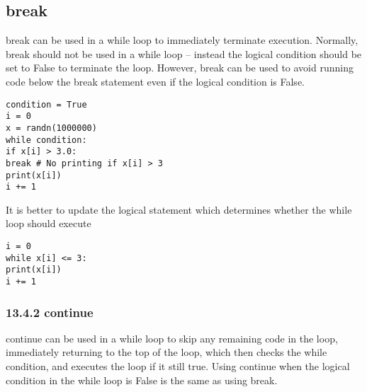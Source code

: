 \subsection{break}
break can be used in a while loop to immediately terminate execution. Normally, break should not be
used in a while loop – instead the logical condition should be set to False to terminate the loop. However,
break can be used to avoid running code below the break statement even if the logical condition is False.

\begin{framed}
\begin{verbatim}
condition = True
i = 0
x = randn(1000000)
while condition:
if x[i] > 3.0:
break # No printing if x[i] > 3
print(x[i])
i += 1
\end{verbatim}
\end{framed}

It is better to update the logical statement which determines whether the while loop should execute

\begin{framed}
\begin{verbatim}
i = 0
while x[i] <= 3:
print(x[i])
i += 1
\end{verbatim}
\end{framed}
\subsubsection{13.4.2 continue}
continue can be used in a while loop to skip any remaining code in the loop, immediately returning to the
top of the loop, which then checks the while condition, and executes the loop if it still true. Using continue
when the logical condition in the while loop is False is the same as using break.



